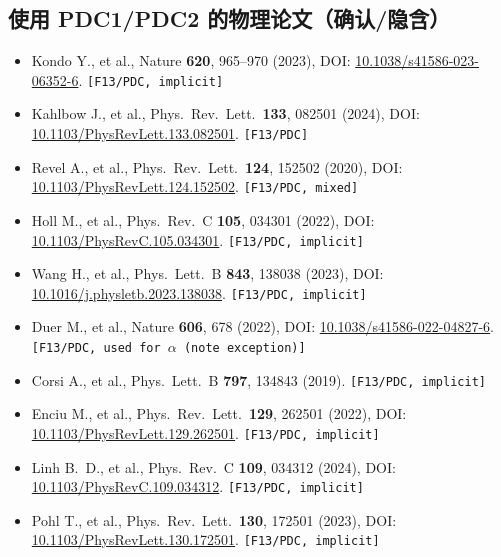 \documentclass[a4paper, 11pt]{article}
\begin{document}
\subsection{使用 PDC1/PDC2 的物理论文（确认/隐含）}
\begin{itemize}
  \item Kondo Y., et al., Nature \textbf{620}, 965--970 (2023), DOI: \href{https://doi.org/10.1038/s41586-023-06352-6}{10.1038/s41586-023-06352-6}. \texttt{[F13/PDC, implicit]}
  \item Kahlbow J., et al., Phys.\ Rev.\ Lett.\ \textbf{133}, 082501 (2024), DOI: \href{https://doi.org/10.1103/PhysRevLett.133.082501}{10.1103/PhysRevLett.133.082501}. \texttt{[F13/PDC]}
  \item Revel A., et al., Phys.\ Rev.\ Lett.\ \textbf{124}, 152502 (2020), DOI: \href{https://doi.org/10.1103/PhysRevLett.124.152502}{10.1103/PhysRevLett.124.152502}. \texttt{[F13/PDC, mixed]}
  \item Holl M., et al., Phys.\ Rev.\ C \textbf{105}, 034301 (2022), DOI: \href{https://doi.org/10.1103/PhysRevC.105.034301}{10.1103/PhysRevC.105.034301}. \texttt{[F13/PDC, implicit]}
  \item Wang H., et al., Phys.\ Lett.\ B \textbf{843}, 138038 (2023), DOI: \href{https://doi.org/10.1016/j.physletb.2023.138038}{10.1016/j.physletb.2023.138038}. \texttt{[F13/PDC, implicit]}
  \item Duer M., et al., Nature \textbf{606}, 678 (2022), DOI: \href{https://doi.org/10.1038/s41586-022-04827-6}{10.1038/s41586-022-04827-6}. \texttt{[F13/PDC, used for $\alpha$ (note exception)]}
  \item Corsi A., et al., Phys.\ Lett.\ B \textbf{797}, 134843 (2019). \texttt{[F13/PDC, implicit]}
  \item Enciu M., et al., Phys.\ Rev.\ Lett.\ \textbf{129}, 262501 (2022), DOI: \href{https://doi.org/10.1103/PhysRevLett.129.262501}{10.1103/PhysRevLett.129.262501}. \texttt{[F13/PDC, implicit]}
  \item Linh B.\ D., et al., Phys.\ Rev.\ C \textbf{109}, 034312 (2024), DOI: \href{https://doi.org/10.1103/PhysRevC.109.034312}{10.1103/PhysRevC.109.034312}. \texttt{[F13/PDC, implicit]}
  \item Pohl T., et al., Phys.\ Rev.\ Lett.\ \textbf{130}, 172501 (2023), DOI: \href{https://doi.org/10.1103/PhysRevLett.130.172501}{10.1103/PhysRevLett.130.172501}. \texttt{[F13/PDC, implicit]}
\end{itemize}
\end{document}
